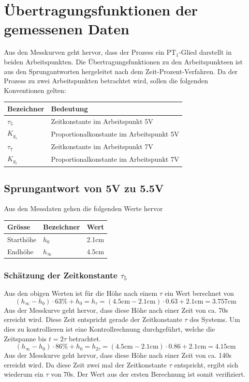 \section{Übertragungsfunktionen der gemessenen Daten}
Aus den Messkurven geht hervor, dass der Prozess ein PT$_1$-Glied darstellt
in beiden Arbeitspunkten. Die Übertragungsfunktionen zu den Arbeitspunkteen
ist aus den Sprungantworten hergeleitet nach dem Zeit-Prozent-Verfahren. Da
der Prozess zu zwei Arbeitspunkten betrachtet wird, sollen die folgenden
Konventionen gelten:

\begin{table}[h!]
	\centering
	\begin{tabular}{l l}
		Bezeichner & Bedeutung \\
		\hline
		$\tau_5$ & Zeitkonstante im Arbeitspunkt 5V \\
		$K_{g_5}$ & Proportionalkonstante im Arbeitspunkt 5V \\
		$\tau_7$ & Zeitkonstante im Arbeitspunkt 7V \\
		$K_{g_7}$ & Proportionalkonstante im Arbeitspunkt 7V 
	\end{tabular}
\end{table}

\subsection{Sprungantwort von 5V zu 5.5V}
Aus den Messdaten gehen die folgenden Werte hervor
\begin{table}[h!]
	\centering
	\begin{tabular}{l l r}
		Grösse & Bezeichner & Wert \\
		\hline
		Starthöhe & $h_0$ & 2.1\si{\centi\meter} \\
		Endhöhe & $h_\infty$ & 4.5\si{\centi\meter} \\
	\end{tabular}
\end{table}

\subsubsection{Schätzung der Zeitkonstante $\tau_5$}
Aus den obigen Werten ist für die Höhe nach einem $\tau$ ein Wert berechnet
von 
\[
	(h_\infty - h_0) \cdot 63\% + h_0
	= h_{\tau}
	= (4.5\si{\centi\meter} - 2.1\si{\centi\meter}) \cdot 0.63
		+ 2.1\si{\centi\meter}
	= 3.757\si{\centi\meter}
\]
Aus der Messkurve geht hervor, dass diese Höhe nach einer Zeit von ca. 70s
erreicht wird. Diese Zeit entspricht gerade der Zeitkonstante $\tau$ des
Systems. Um dies zu kontrollieren ist eine Kontrollrechnung durchgeführt,
welche die Zeitspanne bis $t = 2\tau$ betrachtet.
\[
	(h_\infty - h_0) \cdot 86\% + h_0
	= h_{2\tau}
	= (4.5\si{\centi\meter} - 2.1\si{\centi\meter}) \cdot 0.86
		+ 2.1\si{\centi\meter}
	= 4.15\si{\centi\meter}
\]
Aus der Messkurve geht hervor, dass diese Höhe nach einer Zeit von ca. 140s
erreicht wird. Da diese Zeit zwei mal der Zeitkonstante $\tau$ entspricht,
ergibt sich wiederum ein $\tau$ von 70s. Der Wert aus der ersten Berechnung
ist somit verifiziert.

